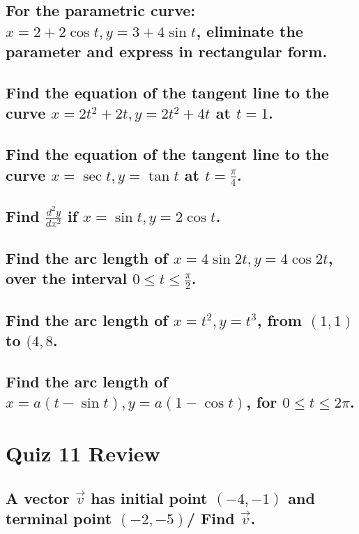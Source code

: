 \documentclass{article}
\begin{document}
\subsection{For the parametric curve: $x = 2 + 2\cos{t}, y = 3 + 4\sin{t}$, eliminate the parameter and express in rectangular form.}

\subsection{Find the equation of the tangent line to the curve $x = 2t^2 + 2t, y = 2t^2 + 4t$ at $t = 1$.}

\subsection{Find the equation of the tangent line to the curve $x = \sec{t}, y = \tan{t}$ at $t = \frac{\pi}{4}$.}

\subsection{Find $\frac{d^2y}{dx^2}$ if $x = \sin{t}, y = 2\cos{t}$.}

\subsection{Find the arc length of $x = 4\sin{2t}, y = 4\cos{2t}$, over the interval $0 \leq t \leq \frac{\pi}{2}$.}

\subsection{Find the arc length of $x = t^2, y = t^3$, from $(1, 1)$ to $(4, 8$.}

\subsection{Find the arc length of $x = a(t - \sin{t}), y = a(1 - \cos{t})$, for $0 \leq t \leq 2\pi$.}









\newpage
\section{Quiz 11 Review}
\subsection{A vector $\vec{v}$ has initial point $(-4, -1)$ and terminal point $(-2, -5)$/ Find $\vec{v}$.}
\end{document}
